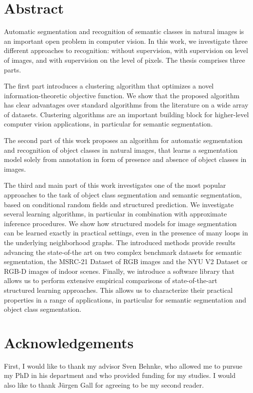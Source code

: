 \documentclass[12pt,toc=bibnumbered, a4paper,twoside,DIV=11,BCOR=.5cm]{scrbook}
\begin{document}
\chapter*{Abstract}
Automatic segmentation and recognition of semantic classes in natural images is
an important open problem in computer vision. In this work, we investigate
three different approaches to recognition: without supervision, with
supervision on level of images, and with supervision on the level of pixels.
The thesis comprises three parts.

The first part introduces a clustering algorithm that optimizes a novel
information-theoretic objective function. We show that the proposed algorithm
has clear advantages over standard algorithms from the literature on a wide
array of datasets. Clustering algorithms are an important building block for
higher-level computer vision applications, in particular for semantic
segmentation.

The second part of this work proposes an algorithm for automatic segmentation
and recognition of object classes in natural images, that learns a segmentation
model solely from annotation in form of presence and absence of object classes
in images.

The third and main part of this work investigates one of the most popular
approaches to the task of object class segmentation and semantic segmentation,
based on conditional random fields and structured prediction.
%
We investigate several learning algorithms, in particular in combination with
approximate inference procedures. We show how structured models for image
segmentation can be learned exactly in practical settings, even in the presence
of many loops in the underlying neighborhood graphs.
The introduced methods provide results advancing the state-of-the art on two
complex benchmark datasets for semantic segmentation, the MSRC-21 Dataset of RGB
images and the NYU V2 Dataset or RGB-D images of indoor scenes.
%
Finally, we introduce a software library that allows us to perform extensive empirical
comparisons of state-of-the-art structured learning approaches. This allows us
to characterize their practical properties in a range of applications, in
particular for semantic segmentation and object class segmentation.


\chapter*{Acknowledgements}
First, I would like to thank my advisor Sven Behnke, who allowed me
to pursue my PhD in his department and who provided funding for my studies.
I would also like to thank J\"urgen Gall for agreeing to be my second reader.
\end{document}
